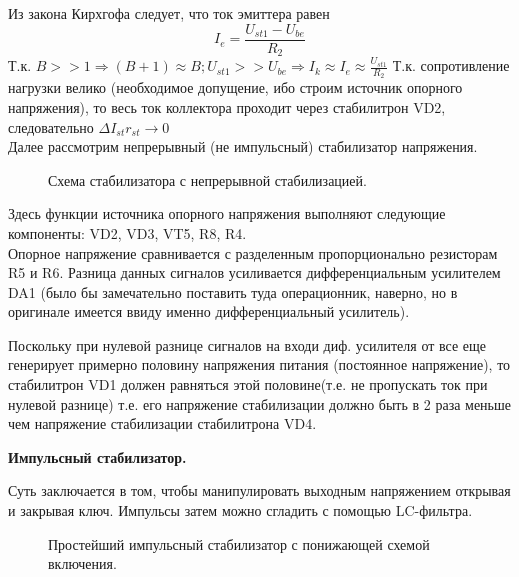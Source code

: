 Из закона Кирхгофа следует, что ток эмиттера равен 
\begin{equation}
I_e = \frac{U_{st1} - U_{be}}{R_2}
\end{equation}
Т.к. $B >>1 \Rightarrow (B+1) \approx B; U_{st1} >> U_{be} \Rightarrow I_k \approx I_e \approx \frac{U_{st1}}{R_2}$
Т.к. сопротивление нагрузки велико (необходимое допущение, ибо строим источник опорного напряжения), то весь ток коллектора проходит через стабилитрон VD2, следовательно $\Delta I_{st} r_{st} \longrightarrow 0$\\

Далее рассмотрим непрерывный (не импульсный) стабилизатор напряжения.\\

\begin{center}
	\begin{figure}[h!]
		\caption{Схема стабилизатора с непрерывной стабилизацией.}	
	\end{figure}
\end{center}



Здесь функции источника опорного напряжения выполняют следующие компоненты:
VD2, VD3, VT5, R8, R4.\\
Опорное напряжение сравнивается с разделенным пропорционально резисторам R5 и R6. Разница данных сигналов усиливается дифференциальным усилителем DA1 (было бы замечательно поставить туда операционник, наверно, но в оригинале имеется ввиду именно дифференциальный усилитель).


Поскольку при нулевой разнице сигналов на входи диф. усилителя от все еще генерирует примерно половину напряжения питания (постоянное напряжение), то стабилитрон VD1 должен равняться этой половине(т.е. не пропускать ток при нулевой разнице) т.е. его напряжение стабилизации должно быть в 2 раза меньше чем напряжение стабилизации стабилитрона VD4.


\textbf{Импульсный стабилизатор.}


Суть заключается в том, чтобы манипулировать выходным напряжением открывая и закрывая ключ. Импульсы затем можно сгладить с помощью LC-фильтра.

\begin{center}
	\begin{figure}[h!]
		\caption{Простейший импульсный стабилизатор с понижающей схемой включения.}	
	\end{figure}
\end{center}

